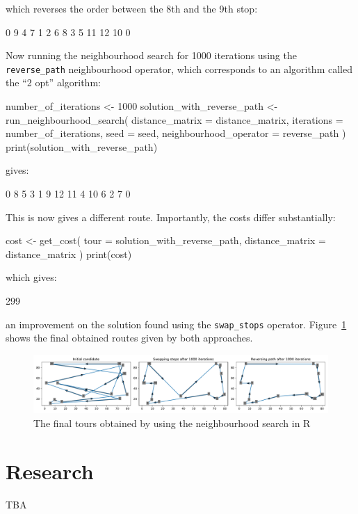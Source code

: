 which reverses the order
between the 8th and the 9th stop:

\begin{Rout}
 [1]  0  9  4  7  1  2  6  8  3  5 11 12 10  0
\end{Rout}

Now running the neighbourhood search for 1000 iterations using the
\texttt{reverse_path} neighbourhood operator, which corresponds to
an algorithm called the ``2 opt'' algorithm: %

\begin{Rin}
number_of_iterations <- 1000
solution_with_reverse_path <- run_neighbourhood_search(
    distance_matrix = distance_matrix,
    iterations = number_of_iterations,
    seed = seed,
    neighbourhood_operator = reverse_path
)
print(solution_with_reverse_path)
\end{Rin}

gives:

\begin{Rout}
 [1]  0  8  5  3  1  9 12 11  4 10  6  2  7  0
\end{Rout}

This is now gives a different route.
Importantly, the costs differ substantially:

\begin{Rin}
cost <- get_cost(
    tour = solution_with_reverse_path,
    distance_matrix = distance_matrix
)
print(cost)
\end{Rin}

which gives:

\begin{Rout}
[1] 299
\end{Rout}

an improvement on the solution found using the \texttt{swap_stops}
operator. Figure~\ref{fig:final-tsp-tours-r} shows the final obtained routes
given by both approaches.


\begin{figure}
    \begin{center}
        \includegraphics[width=\textwidth]{./assets/final-tsp-tours-with-R/main.pdf}
    \end{center}
    \caption{The final tours obtained by using the neighbourhood search in R}
    \label{fig:final-tsp-tours-r}
\end{figure}

\section{Research}\label{sec:research}

TBA
